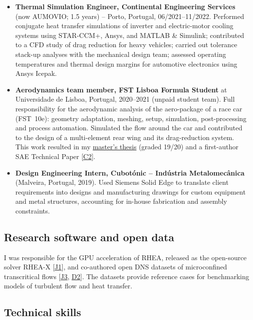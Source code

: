 \documentclass[11pt]{article}
\newcommand{\NEW}[1]{\iffinal #1\else{\color{red}#1}\fi} %
\begin{document}
\begin{itemize}[itemsep=3pt]
	\item \textbf{Thermal Simulation Engineer, Continental Engineering Services} (now AUMOVIO; 1.5 years) -- Porto, Portugal, 06/2021--11/2022. Performed conjugate heat transfer simulations of inverter and electric-motor cooling systems using STAR-CCM+, Ansys, and \NEW{MATLAB} \& Simulink; contributed to a CFD study of drag reduction for heavy vehicles; carried out tolerance stack-up analyses with the mechanical design team;
	assessed operating temperatures and thermal design margins for automotive electronics using Ansys Icepak. 
	
	\item \textbf{Aerodynamics team member, FST Lisboa Formula Student} at Universidade de Lisboa, Portugal, 2020--2021 (unpaid student team). Full responsibility for the \NEW{aerodynamic} analysis of the aero-package of a \NEW{race car} (FST~10e): geometry adaptation, meshing, setup, simulation, post-processing and process automation. Simulated the flow around the car and contributed to the design of a multi-element rear wing and its	drag-reduction system. This work resulted in my \href{http://hdl.handle.net/10362/149236}{master's thesis} (graded 19/20) and a first-author SAE Technical Paper [\hyperlink{pub-C2}{C2}].\nocert
	
	\item \textbf{Design Engineering Intern, Cubot\'onic -- Ind\'ustria Metalomec\^anica}
	(Malveira, Portugal, 2019).
	Used Siemens Solid Edge to translate client requirements into designs and manufacturing drawings for custom equipment and metal structures, accounting for in-house fabrication and assembly constraints.\nocert
\end{itemize}

\subsection{Research software and open data}

I was responsible for the GPU acceleration of RHEA, released as the open-source solver RHEA-X [\hyperlink{pub-J1}{J1}], and co-authored open DNS datasets of microconfined transcritical flows [\hyperlink{pub-J3}{J3}, \hyperlink{pub-D2}{D2}]. The datasets provide reference cases for benchmarking models of turbulent flow and heat transfer.

\subsection{Technical skills}
\end{document}
